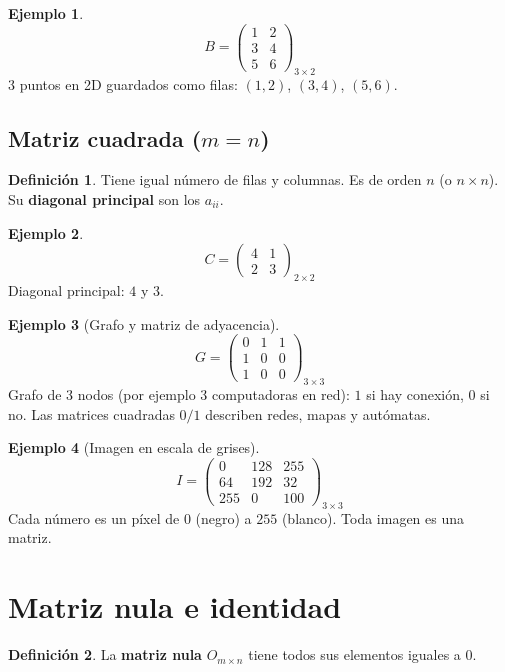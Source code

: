 \documentclass[a4paper,12pt]{article}
\theoremstyle{definition}
\newtheorem{definicion}{Definición}[section]
\newtheorem{ejemplo}{Ejemplo}[section]
\begin{document}
\begin{ejemplo}
\[
B = \begin{pmatrix}
1 & 2 \\
3 & 4 \\
5 & 6
\end{pmatrix}_{3 \times 2}
\]
3 puntos en 2D guardados como filas: $(1,2)$, $(3,4)$, $(5,6)$.
\end{ejemplo}

\subsection{Matriz cuadrada ($m=n$)}
\begin{definicion}
Tiene igual número de filas y columnas. Es de orden $n$ (o $n \times n$). Su \textbf{diagonal principal} son los $a_{ii}$.
\end{definicion}

\begin{ejemplo}
\[
C = \begin{pmatrix}
4 & 1 \\
2 & 3
\end{pmatrix}_{2 \times 2}
\]
Diagonal principal: $4$ y $3$.
\end{ejemplo}

\begin{ejemplo}[Grafo y matriz de adyacencia]
\[
G = \begin{pmatrix}
0 & 1 & 1 \\
1 & 0 & 0 \\
1 & 0 & 0
\end{pmatrix}_{3 \times 3}
\]
Grafo de 3 nodos (por ejemplo 3 computadoras en red): $1$ si hay conexión, $0$ si no. Las matrices cuadradas $0/1$ describen redes, mapas y autómatas.
\end{ejemplo}

\begin{ejemplo}[Imagen en escala de grises]
\[
I = \begin{pmatrix}
0 & 128 & 255 \\
64 & 192 & 32 \\
255 & 0 & 100
\end{pmatrix}_{3 \times 3}
\]
Cada número es un píxel de $0$ (negro) a $255$ (blanco). Toda imagen es una matriz.
\end{ejemplo}

\section{Matriz nula e identidad}
\begin{definicion}
La \textbf{matriz nula} $O_{m \times n}$ tiene todos sus elementos iguales a $0$.
\end{definicion}
\end{document}
